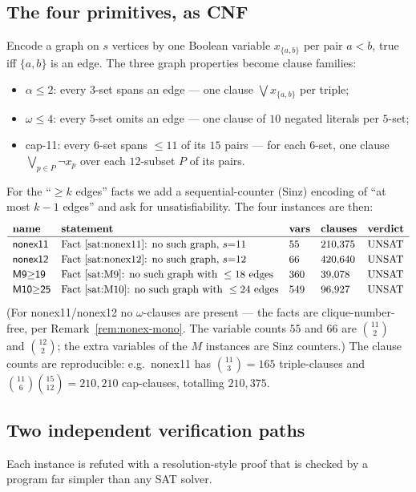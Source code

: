 \documentclass[11pt,reqno]{amsart}
\theoremstyle{definition}
\theoremstyle{remark}
\newcommand{\capeleven}{\textsf{cap-11}}
\begin{document}
\subsection{The four primitives, as CNF}
Encode a graph on $s$ vertices by one Boolean variable $x_{\{a,b\}}$ per pair
$a<b$, true iff $\{a,b\}$ is an edge. The three graph properties become clause
families:
\begin{itemize}[nosep]
\item $\alpha\le 2$: every $3$-set spans an edge --- one clause
$\bigvee x_{\{a,b\}}$ per triple;
\item $\omega\le 4$: every $5$-set omits an edge --- one clause of $10$ negated
literals per $5$-set;
\item \capeleven: every $6$-set spans $\le 11$ of its $15$ pairs --- for each
$6$-set, one clause $\bigvee_{p\in P}\lnot x_p$ over each $12$-subset $P$ of its
pairs.
\end{itemize}
For the ``$\ge k$ edges'' facts we add a sequential-counter (Sinz) encoding of
``at most $k-1$ edges'' and ask for unsatisfiability. The four instances are then:
\[
  \renewcommand{\arraystretch}{1.2}
  \begin{array}{lllll}
    \textbf{name} & \textbf{statement} & \textbf{vars} & \textbf{clauses} & \textbf{verdict}\\\hline
    \textsf{nonex11} & \text{Fact~\ref{sat:nonex11}: no such graph, }s{=}11 & 55 & 210{,}375 & \text{UNSAT}\\
    \textsf{nonex12} & \text{Fact~\ref{sat:nonex12}: no such graph, }s{=}12 & 66 & 420{,}640 & \text{UNSAT}\\
    \textsf{M9$\ge$19} & \text{Fact~\ref{sat:M9}: no such graph with }\le 18\text{ edges} & 360 & 39{,}078 & \text{UNSAT}\\
    \textsf{M10$\ge$25} & \text{Fact~\ref{sat:M10}: no such graph with }\le 24\text{ edges} & 549 & 96{,}927 & \text{UNSAT}
  \end{array}
\]
(For \textsf{nonex11}/\textsf{nonex12} no $\omega$-clauses are present --- the facts
are clique-number-free, per Remark~\ref{rem:nonex-mono}. The variable counts $55$
and $66$ are $\binom{11}2$ and $\binom{12}2$; the extra variables of the $M$
instances are Sinz counters.) The clause counts are reproducible: e.g.\ \textsf{nonex11}
has $\binom{11}3=165$ triple-clauses and $\binom{11}6\binom{15}{12}=210{,}210$
cap-clauses, totalling $210{,}375$.

\subsection{Two independent verification paths}
Each instance is refuted with a resolution-style proof that is checked by a program
far simpler than any SAT solver.
\end{document}
